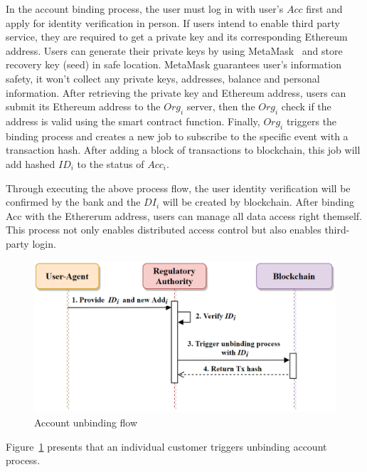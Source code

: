     In the account binding process, the user must log in with user's \(Acc\) first and apply for identity verification in person. If users intend to enable third party service, they are required to get a private key and its corresponding Ethereum address. Users can generate their private keys by using MetaMask~\cite{metamask} and store recovery key (seed) in safe location. MetaMask guarantees user's information safety, it won't collect any private keys, addresses, balance and personal information. After retrieving the private key and Ethereum address, users can submit its Ethereum address to the \(Org_i\) server, then the \(Org_i\) check if the address is valid using the smart contract function. Finally, \(Org_i\) triggers the binding process and creates a new job to subscribe to the specific event with a transaction hash. After adding a block of transactions to blockchain, this job will add hashed \(ID_i\) to the status of \(Acc_i\).\par
    Through executing the above process flow, the user identity verification will be confirmed by the bank and the \(DI_i\) will be created by blockchain. After binding Acc with the Ethererum address, users can manage all data access right themself. This process not only enables distributed access control but also enables third-party login.

    \newpage

    \begin{figure}[htb]
        \centering
        \includegraphics[height=!,width=0.8\linewidth,keepaspectratio=true]{figures/account_unbinding.png}
        \caption{{\footnotesize Account unbinding flow}}
        \label{fig:accountunBinding}
    \end{figure}

    Figure~\ref{fig:accountunBinding} presents that an individual customer triggers unbinding account process. 

    \newpage

